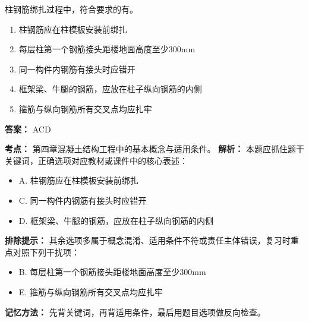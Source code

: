 \documentclass[UTF8,fontset=fandol,11pt]{ctexart}
\begin{document}
\begin{quizbox}[title={第 29 题}]
柱钢筋绑扎过程中，符合要求的有。\\
\begin{enumerate}[label=\Alph*.]
\item 柱钢筋应在柱模板安装前绑扎
\item 每层柱第一个钢筋接头距楼地面高度至少300mm
\item 同一构件内钢筋有接头时应错开
\item 框架梁、牛腿的钢筋，应放在柱子纵向钢筋的内侧
\item 箍筋与纵向钢筋所有交叉点均应扎牢
\end{enumerate}
\textbf{答案：} ACD
\vspace{0.25em}
\begin{answerbox}[title={考点解析}]
\textbf{考点：} 第四章混凝土结构工程中的基本概念与适用条件。
\textbf{解析：} 本题应抓住题干关键词，正确选项对应教材或课件中的核心表述：
\begin{itemize}
\item A. 柱钢筋应在柱模板安装前绑扎
\item C. 同一构件内钢筋有接头时应错开
\item D. 框架梁、牛腿的钢筋，应放在柱子纵向钢筋的内侧
\end{itemize}
\textbf{排除提示：} 其余选项多属于概念混淆、适用条件不符或责任主体错误，复习时重点对照下列干扰项：
\begin{itemize}
\item B. 每层柱第一个钢筋接头距楼地面高度至少300mm
\item E. 箍筋与纵向钢筋所有交叉点均应扎牢
\end{itemize}
\textbf{记忆方法：} 先背关键词，再背适用条件，最后用题目选项做反向检查。
\end{answerbox}
\end{quizbox}
\end{document}
